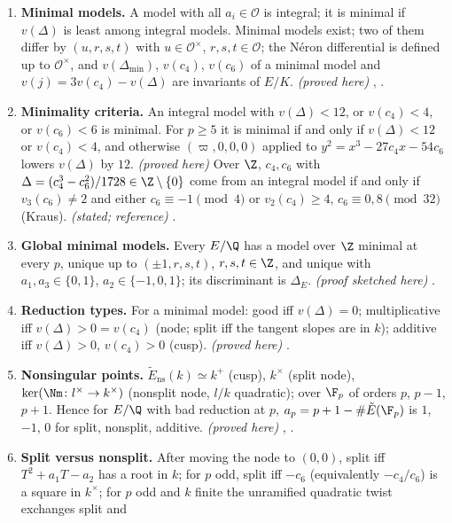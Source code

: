 \begin{enumerate}[label=\textbf{\thechapter.\arabic*}]
\item \textbf{Minimal models.} A model with all $a_i\in\mathcal O$ is integral; it is minimal if $v(\Delta)$ is least among integral
models. Minimal models exist; two of them differ by $(u,r,s,t)$ with $u\in\mathcal O^\times$, $r,s,t\in\mathcal O$; the N\'eron differential
is defined up to $\mathcal O^\times$, and $v(\Delta_{\min})$, $v(c_4)$, $v(c_6)$ of a minimal model and $v(j)=3v(c_4)-v(\Delta)$ are invariants
of $E/K$. \emph{(proved here)} , .
\item \textbf{Minimality criteria.} An integral model with $v(\Delta)<12$, or $v(c_4)<4$, or $v(c_6)<6$ is minimal. For $p\ge5$ it is
minimal if and only if $v(\Delta)<12$ or $v(c_4)<4$, and otherwise $(\varpi,0,0,0)$ applied to $y^2=x^3-27c_4x-54c_6$ lowers $v(\Delta)$ by
$12$. \emph{(proved here)} Over $\Z$, $c_4,c_6$ with $\Delta=(c_4^3-c_6^2)/1728\in\Z\setminus\{0\}$ come from an integral model if and only if
$v_3(c_6)\ne2$ and either $c_6\equiv-1\pmod4$ or $v_2(c_4)\ge4$, $c_6\equiv0,8\pmod{32}$ (Kraus). \emph{(stated; reference)}
.
\item \textbf{Global minimal models.} Every $E/\Q$ has a model over $\Z$ minimal at every $p$, unique up to $(\pm1,r,s,t)$,
$r,s,t\in\Z$, and unique with $a_1,a_3\in\{0,1\}$, $a_2\in\{-1,0,1\}$; its discriminant is $\Delta_E$. \emph{(proof sketched here)}
.
\item \textbf{Reduction types.} For a minimal model: good iff $v(\Delta)=0$; multiplicative iff $v(\Delta)>0=v(c_4)$ (node; split iff
the tangent slopes are in $k$); additive iff $v(\Delta)>0$, $v(c_4)>0$ (cusp). \emph{(proved here)} .
\item \textbf{Nonsingular points.} $\tilde E_{\mathrm{ns}}(k)\simeq k^+$ (cusp), $k^\times$ (split node), $\ker(\Nm\colon l^\times\to k^\times)$
(nonsplit node, $l/k$ quadratic); over $\F_p$ of orders $p$, $p-1$, $p+1$. Hence for $E/\Q$ with bad reduction at $p$,
$a_p=p+1-\#\tilde E(\F_p)$ is $1$, $-1$, $0$ for split, nonsplit, additive. \emph{(proved here)} ,
.
\item \textbf{Split versus nonsplit.} After moving the node to $(0,0)$, split iff $T^2+a_1T-a_2$ has a root in $k$; for $p$ odd, split iff
$-c_6$ (equivalently $-c_4/c_6$) is a square in $k^\times$; for $p$ odd and $k$ finite the unramified quadratic twist exchanges split and

\end{enumerate}
